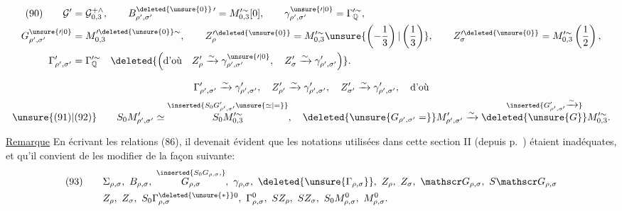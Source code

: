 \[
\begin{aligned}
 (90)\qquad
 \mathcal G'&=\mathcal G_{0,3}^{+\wedge},\qquad
 B_{\rho',\sigma'}^{\deleted{\unsure{0}}\,\prime}
 =M_{0,3}^{\prime\sim}[0],\qquad
 \gamma_{\rho',\sigma'}^{\unsure{\prime|0}}
 =\Gamma_{\mathbb Q}^{\prime\sim},\\
 G_{\rho',\sigma'}^{\unsure{\prime|0}}
 &=M_{0,3}^{\prime\deleted{\unsure{0}}\sim},\qquad
 Z_{\rho}^{\prime\deleted{\unsure{0}}}
 =M_{0,3}^{\prime\sim}\unsure{\left(-\frac13\right)|\left(\frac13\right)},\qquad
 Z_{\sigma}^{\prime\deleted{\unsure{0}}}
 =M_{0,3}^{\prime\sim}\left(\frac12\right),\\
 \Gamma_{\rho',\sigma'}^{\prime}&=\Gamma_{\mathbb Q}^{\prime\sim}
 \quad\deleted{\left(\text{d'où}\quad
 Z_{\rho}^{\prime}\xrightarrow{\sim}\gamma_{\rho',\sigma'}^{\unsure{\prime|0}},\quad
 Z_{\sigma}^{\prime}\xrightarrow{\sim}\gamma_{\rho',\sigma'}^{\prime}\right)}.
\end{aligned}
\]


\[
\begin{gathered}
\Gamma_{\rho',\sigma'}^{\prime}\xrightarrow{\sim}\gamma_{\rho',\sigma'}^{\prime},\quad
Z_{\rho'}^{\prime}\xrightarrow{\sim}\gamma_{\rho',\sigma'}^{\prime},\quad
Z_{\sigma'}^{\prime}\xrightarrow{\sim}\gamma_{\rho',\sigma'}^{\prime},\quad\text{d'où}\\
\unsure{(91)|(92)}\qquad
S_0M_{\rho',\sigma'}^{\prime}\simeq
\overset{\inserted{S_0G_{\rho',\sigma'}^{\prime}\unsure{\simeq|=}}}{S_0M_{0,3}^{\prime\sim}},\quad
\deleted{\unsure{G_{\rho',\sigma'}=}}M_{\rho',\sigma'}^{\prime}\xrightarrow{\sim}
\overset{\inserted{G_{\rho',\sigma'}^{\prime}\xrightarrow{\sim}}}{\deleted{\unsure{G}}M_{0,3}^{\prime\sim}}.
\end{gathered}
\]

\uline{Remarque} En écrivant les relations (86), il devenait évident que les notations utilisées dans cette section II (depuis p.\ ) étaient inadéquates, et qu'il convient de les modifier de la façon suivante:
\[
\begin{aligned}
(93)\qquad&\Sigma_{\rho,\sigma},\ B_{\rho,\sigma},\
\overset{\inserted{S_0G_{\rho,\sigma},}}{G_{\rho,\sigma}},\
\gamma_{\rho,\sigma},\ \deleted{\unsure{\Gamma_{\rho,\sigma}}},\
Z_\rho,\ Z_\sigma,\ \mathscr G_{\rho,\sigma},\ S\mathscr G_{\rho,\sigma}\\
&Z_\rho,\ Z_\sigma,\ S_0\Gamma_{\rho,\sigma}^{\deleted{\unsure{*}}0},\
\Gamma_{\rho,\sigma}^0,\ SZ_\rho,\ SZ_\sigma,\ S_0M_{\rho,\sigma}^0,\ M_{\rho,\sigma}^0.
\end{aligned}
\]

